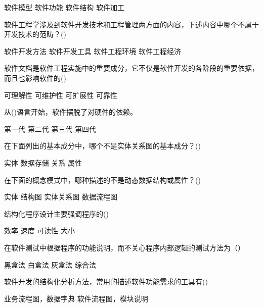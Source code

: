 \documentclass[answers]{exam}
\begin{document}
\begin{questions}
\begin{oneparchoices}
		\choice 软件模型
		\correctchoice 软件功能
		\choice 软件结构
		\choice 软件加工
	\end{oneparchoices}
	\question 软件工程学涉及到软件开发技术和工程管理两方面的内容，下述内容中哪个不属于开发技术的范畴？()\\
	\begin{oneparchoices}
		\choice 软件开发方法
		\choice 软件开发工具
		\choice 软件工程环境
		\correctchoice 软件工程经济
	\end{oneparchoices}
	\question 软件文档是软件工程实施中的重要成分，它不仅是软件开发的各阶段的重要依据，而且也影响软件的()\\
	\begin{oneparchoices}
		\choice 可理解性
		\correctchoice 可维护性
		\choice 可扩展性
		\choice 可靠性
	\end{oneparchoices}
	\question 从()语言开始，软件摆脱了对硬件的依赖。\\
	\begin{oneparchoices}
		\choice 第一代
		\choice 第二代
		\correctchoice 第三代
		\choice 第四代
	\end{oneparchoices}
	\question 在下面列出的基本成分中，哪个不是实体关系图的基本成分？()\\
	\begin{oneparchoices}
		\choice 实体
		\correctchoice 数据存储
		\choice 关系
		\choice 属性
	\end{oneparchoices}
	\question 在下面的概念模式中，哪种描述的不是动态数据结构或属性？()\\
	\begin{oneparchoices}
		\choice 实体
		\choice 结构图
		\correctchoice 实体关系图
		\choice 数据流程图
	\end{oneparchoices}
	\question 结构化程序设计主要强调程序的()\\
	\begin{oneparchoices}
		\choice 效率
		\choice 速度
		\correctchoice 可读性
		\choice 大小
	\end{oneparchoices}
	\question 在软件测试中根据程序的功能说明，而不关心程序内部逻辑的测试方法为（）\\
	\begin{oneparchoices}
		\correctchoice 黑盒法
		\choice 白盒法
		\choice 灰盒法
		\choice 综合法
	\end{oneparchoices}
	\question 软件开发的结构化分析方法，常用的描述软件功能需求的工具有()\\
	\begin{oneparchoices}
		\choice 业务流程图，数据字典
		\choice 软件流程图，模块说明\\

\end{oneparchoices}
\end{questions}
\end{document}
